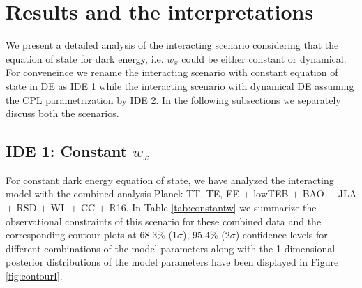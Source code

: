\documentclass[superscriptaddress,oneolumn,secnumarabic,
amssymb,amsmath,nobibnotes,aps,prd,showpacs,nofootinbib]{revtex4}%
\begin{document}
\section{Results and the interpretations}
\label{sec-results}

We present a detailed analysis of the interacting scenario considering that the equation of state for dark energy, i.e. $w_x$ could be either constant or dynamical. For conveneince we rename the interacting scenario with constant equation of state in DE as IDE 1 while the interacting scenario with dynamical DE assuming the CPL parametrization by IDE 2. In the following subsections we separately discuss both the scenarios.


\subsection{IDE 1: Constant $w_x$}
\label{sec-constant}

For constant dark energy equation of state, we have analyzed the interacting model with the combined analysis Planck TT, TE, EE $+$ lowTEB $+$ BAO $+$ JLA $+$ RSD $+$ WL $+$ CC $+$ R16. In Table \ref{tab:constantw} we summarize the observational constraints of this scenario for these combined data and the corresponding contour plots at 68.3\% ($1\sigma$), 95.4\% ($2\sigma$) confidence-levels for different combinations of the model parameters along with the 1-dimensional posterior distributions of the model parameters have been displayed in Figure \ref{fig:contourI}.
\end{document}
